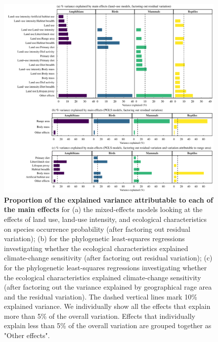 \begin{figure}[h!]
\centering
\includegraphics[scale=0.6]{figures/Chapter4/Figure4}
\caption[Proportion of the explained variance attributable to each of the main effects in the land-use and climate-change sensitivity models]{\textbf{Proportion of the explained variance attributable to each of the main effects} for (a) the mixed-effects models looking at the effects of land use, land-use intensity, and ecological characteristics on species occurrence probability (after factoring out residual variation); (b) for the phylogenetic least-squares regressions investigating whether the ecological characteristics explained climate-change sensitivity (after factoring out residual variation); (c) for the phylogenetic least-squares regressions investigating whether the ecological characteristics explained climate-change sensitivity (after factoring out the variance explained by geographical rage area and the residual variation). The dashed vertical lines mark 10\% explained variance. We individually show all the effects that explain more than 5\% of the overall variation. Effects that individually explain less than 5\% of the overall variation are grouped together as "Other effects".}
\label{chap4_fig4}
\end{figure}

